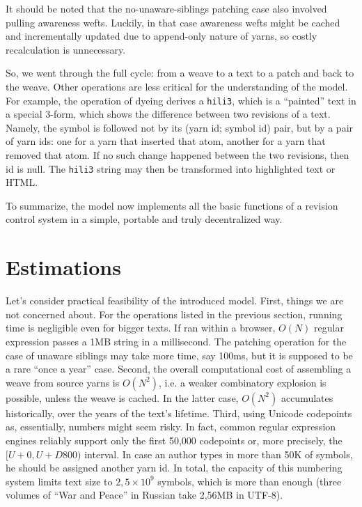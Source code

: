 \documentclass{acm_proc_article-sp}
\begin{document}
It should be noted that the no-unaware-siblings patching case
also involved pulling awareness wefts. Luckily, in that case
awareness wefts might be cached and incrementally updated
due to append-only nature of yarns, so costly recalculation
is unnecessary.

So, we went through the full cycle: from a weave to a text
to a patch and back to the weave. Other operations are less
critical for the understanding of the model. For example, the
operation of dyeing derives a {\tt hili3}, which is a
``painted'' text in a special 3-form, which shows 
the difference between
two revisions of a text. Namely, the symbol is
followed not by its (yarn id; symbol id) pair, but by a pair
of yarn ids: one for a yarn that inserted that atom,
another for a yarn that removed that atom. If no such
change happened between the two revisions, then id is null.
The {\tt hili3} string may then be transformed into
highlighted text or HTML.

To summarize, the model now implements all the basic
functions of a revision control system in a simple, 
portable and truly decentralized way.

\section{Estimations}

Let's consider practical feasibility of the introduced model.
First, things we are not concerned about. For the operations
listed in the previous section, running time is negligible
even for bigger texts. If ran within a browser, $O(N)$
regular expression passes a 1MB string in a millisecond.
The patching operation for the case of unaware siblings may
take more time, say 100ms, but it is supposed to be a rare
``once a year'' case.
Second, the overall computational cost of assembling a weave
from source yarns is $O(N^{2})$, i.e. a weaker combinatory
explosion is possible, unless the weave is cached. In the
latter case, $O(N^{2})$ accumulates historically, over the
years of the text's lifetime.
Third, using Unicode codepoints as, essentially, numbers
might seem risky. In fact, common regular expression engines
reliably support only the first 50,000 codepoints or, more
precisely, the $[U+0,U+D800)$ interval. In case an author
types in more than 50K of symbols, he should be assigned
another yarn id. In total, the capacity of this numbering
system limits text size to $2,5\times10^9$ symbols, which is more
than enough (three volumes of ``War and Peace'' in Russian
take 2,56MB in UTF-8).
\end{document}
